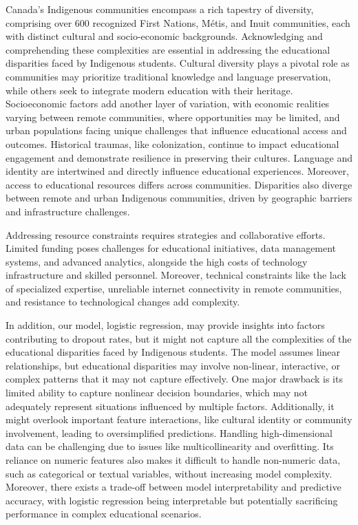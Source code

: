 \documentclass[a4paper,twoside]{article}
\begin{document}
Canada's Indigenous communities encompass a rich tapestry of diversity, comprising over 600 recognized First Nations, Métis, and Inuit communities, each with distinct cultural and socio-economic backgrounds. Acknowledging and comprehending these complexities are essential in addressing the educational disparities faced by Indigenous students. Cultural diversity plays a pivotal role as communities may prioritize traditional knowledge and language preservation, while others seek to integrate modern education with their heritage. Socioeconomic factors add another layer of variation, with economic realities varying between remote communities, where opportunities may be limited, and urban populations facing unique challenges that influence educational access and outcomes. Historical traumas, like colonization, continue to impact educational engagement and demonstrate resilience in preserving their cultures. Language and identity are intertwined and directly influence educational experiences. Moreover, access to educational resources differs across communities. Disparities also diverge between remote and urban Indigenous communities, driven by geographic barriers and infrastructure challenges.

Addressing resource constraints requires strategies and collaborative efforts. Limited funding poses challenges for educational initiatives, data management systems, and advanced analytics, alongside the high costs of technology infrastructure and skilled personnel. Moreover, technical constraints like the lack of specialized expertise, unreliable internet connectivity in remote communities, and resistance to technological changes add complexity.

In addition, our model, logistic regression, may provide insights into factors contributing to dropout rates, but it might not capture all the complexities of the educational disparities faced by Indigenous students. The model assumes linear relationships, but educational disparities may involve non-linear, interactive, or complex patterns that it may not capture effectively. One major drawback is its limited ability to capture nonlinear decision boundaries, which may not adequately represent situations influenced by multiple factors. Additionally, it might overlook important feature interactions, like cultural identity or community involvement, leading to oversimplified predictions. Handling high-dimensional data can be challenging due to issues like multicollinearity and overfitting. Its reliance on numeric features also makes it difficult to handle non-numeric data, such as categorical or textual variables, without increasing model complexity. Moreover, there exists a trade-off between model interpretability and predictive accuracy, with logistic regression being interpretable but potentially sacrificing performance in complex educational scenarios.
\end{document}
